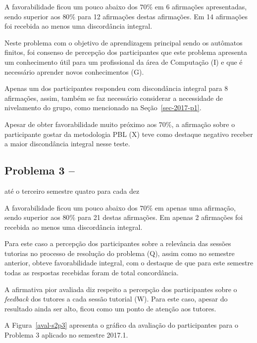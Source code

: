 A favorabilidade ficou um pouco abaixo dos $70\%$ em 6 afirmações apresentadas,
sendo superior aos $80\%$ para 12 afirmações destas afirmações.
Em 14 afirmações foi recebida ao menos uma discordância integral.

Neste problema com o objetivo de aprendizagem principal sendo
os autômatos finitos, foi consenso de percepção dos participantes que
este problema apresenta um conhecimento útil para um profissional
da área de Computação (I) e que é necessário aprender novos
conhecimentos (G).

Apenas um dos participantes respondeu com discondância integral para
8 afirmações, assim, também se faz necessário considerar a
necessidade de nivelamento do grupo, como mencionado
na Seção~\ref{sec-2017-p1}.

Apesar de obter favorabilidade muito próximo aos $70\%$, a afirmação
sobre o participante gostar da metodologia PBL (X) teve como
destaque negativo receber a maior discondância integral nesse
teste.


\subsection{Problema 3 -- \ProblemaC}
{até o terceiro semestre}{ quatro para cada dez}

A favorabilidade ficou um pouco abaixo dos $70\%$ em apenas uma afirmação,
sendo superior aos $80\%$ para 21 destas afirmações.
Em apenas 2 afirmações foi recebida ao menos uma discordância integral.

Para este caso a percepção dos participantes
sobre a relevância das sessões tutorias no processo
de resolução do problema (Q), assim como no semestre
anterior, obteve favorabilidade integral, com o destaque de
que para este semestre todas as respostas recebidas foram de
total concordância.

A afirmativa pior avaliada diz respeito a percepção dos participantes
sobre o \textit{feedback} dos tutores a cada sessão tutorial (W).
Para este caso, apesar do resultado ainda ser alto, ficou como
um ponto de atenção aos tutores.

A Figura~\ref{aval-s2p3} apresenta o gráfico da
avaliação do participantes para o Problema 3 aplicado no semestre 2017.1.

